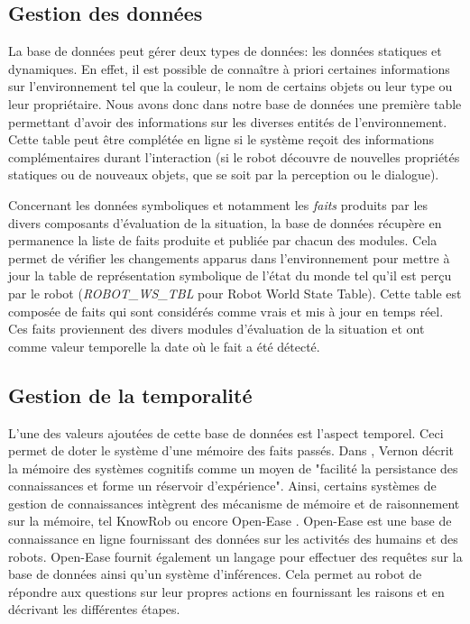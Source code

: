 \documentclass[a4paper,11pt,twoside]{StyleThese}
\begin{document}
\subsection{Gestion des données}
\label{sec:dbd}
La base de données peut gérer deux types de données: les données statiques et dynamiques. En effet, il est possible de connaître à priori certaines informations sur l'environnement tel que la couleur, le nom de certains objets ou leur type ou leur propriétaire. 
Nous avons donc dans notre base de données une première table permettant d'avoir des informations sur les diverses entités de l'environnement. Cette table peut être complétée en ligne si le système reçoit des informations complémentaires durant l'interaction (si le robot découvre de nouvelles propriétés statiques ou de nouveaux objets, que se soit par la perception ou le dialogue).

Concernant les données symboliques et notamment les \textit{faits} produits par les divers composants d'évaluation de la situation, la base de données récupère en permanence la liste de faits produite et publiée par chacun des modules. Cela permet de vérifier les changements apparus dans l'environnement pour mettre à jour la table de représentation symbolique de l'état du monde tel qu'il est perçu par le robot (\textit{ROBOT\_WS\_TBL} pour Robot World State Table).
Cette table est composée de faits qui sont considérés comme vrais et mis à jour en temps réel. Ces faits proviennent des divers modules d'évaluation de la situation et ont comme valeur temporelle la date où le fait a été détecté.


\subsection{Gestion de la temporalité}
\label{sec:dbt}
L'une des valeurs ajoutées de cette base de données est l'aspect temporel.
Ceci permet de doter le système d'une mémoire des faits passés.
Dans \cite{vernon2014artificial}, Vernon décrit la mémoire des systèmes cognitifs comme un moyen de "facilité la persistance des connaissances et forme un réservoir d'expérience".
Ainsi, certains systèmes de gestion de connaissances intègrent des mécanisme de mémoire et de raisonnement sur la mémoire, tel KnowRob \cite{tenorth2015representations} ou encore Open-Ease \cite{beetz2015open}.
Open-Ease est une base de connaissance en ligne fournissant des données sur les activités des humains et des robots. Open-Ease fournit également un langage pour effectuer des requêtes sur la base de données ainsi qu'un système d'inférences. Cela permet au robot de répondre aux questions sur leur propres actions en fournissant les raisons et en décrivant les différentes étapes.
\end{document}
